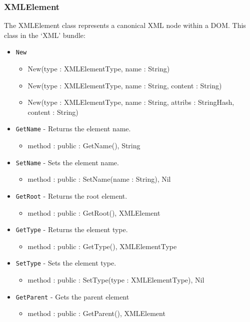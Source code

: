 \documentclass[12pt]{article}
\begin{document}
\subsubsection{XMLElement}
The XMLElement class represents a canonical XML node within a DOM. This class in the `XML' bundle:
\begin{itemize}
\item \texttt{New}
  \begin{itemize}
  \item New(type : XMLElementType, name : String)
  \item New(type : XMLElementType, name : String, content : String)
  \item New(type : XMLElementType, name : String, attribs : StringHash, content : String)
  \end{itemize}
\item \texttt{GetName} - Returns the element name.
  \begin{itemize}
  \item method : public : GetName(), String
  \end{itemize}
\item \texttt{SetName} - Sets the element name.
  \begin{itemize}
  \item method : public : SetName(name : String), Nil
  \end{itemize}
\item \texttt{GetRoot} - Returns the root element.
  \begin{itemize}
  \item method : public : GetRoot(), XMLElement
  \end{itemize}
\item \texttt{GetType} - Returns the element type.
  \begin{itemize}
  \item method : public : GetType(), XMLElementType
  \end{itemize}
\item \texttt{SetType} - Sets the element type.
  \begin{itemize}
  \item method : public : SetType(type : XMLElementType), Nil
  \end{itemize}
\item \texttt{GetParent} - Gets the parent element
  \begin{itemize}
  \item method : public : GetParent(), XMLElement
  \end{itemize}

\end{itemize}
\end{document}
